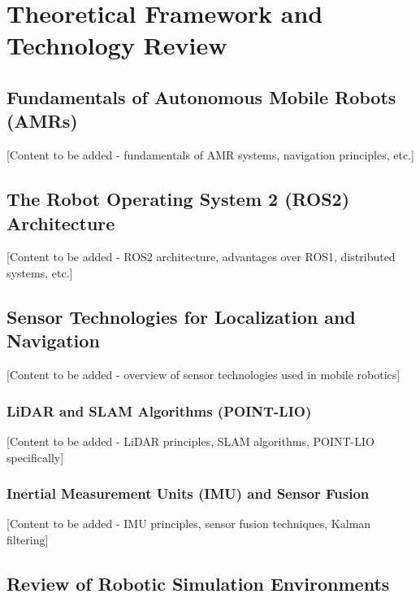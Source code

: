 \vspace{21.5pt}
\chapter{Theoretical Framework and Technology Review}

\section{Fundamentals of Autonomous Mobile Robots (AMRs)}

[Content to be added - fundamentals of AMR systems, navigation principles, etc.]

\section{The Robot Operating System 2 (ROS2) Architecture}

[Content to be added - ROS2 architecture, advantages over ROS1, distributed systems, etc.]

\section{Sensor Technologies for Localization and Navigation}

[Content to be added - overview of sensor technologies used in mobile robotics]

\subsection{LiDAR and SLAM Algorithms (POINT-LIO)}

[Content to be added - LiDAR principles, SLAM algorithms, POINT-LIO specifically]

\subsection{Inertial Measurement Units (IMU) and Sensor Fusion}

[Content to be added - IMU principles, sensor fusion techniques, Kalman filtering]

\section{Review of Robotic Simulation Environments}

